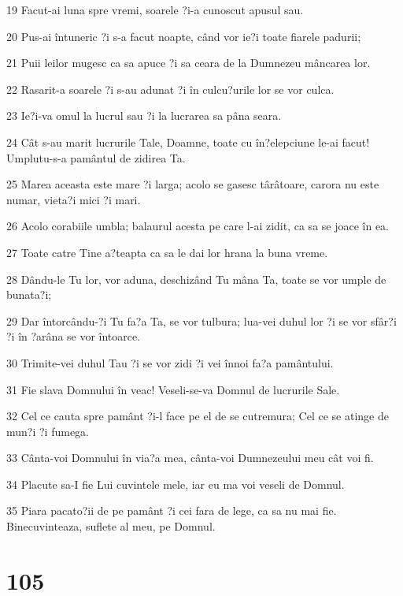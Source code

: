 \par 19 Facut-ai luna spre vremi, soarele ?i-a cunoscut apusul sau.
\par 20 Pus-ai întuneric ?i s-a facut noapte, când vor ie?i toate fiarele padurii;
\par 21 Puii leilor mugesc ca sa apuce ?i sa ceara de la Dumnezeu mâncarea lor.
\par 22 Rasarit-a soarele ?i s-au adunat ?i în culcu?urile lor se vor culca.
\par 23 Ie?i-va omul la lucrul sau ?i la lucrarea sa pâna seara.
\par 24 Cât s-au marit lucrurile Tale, Doamne, toate cu în?elepciune le-ai facut! Umplutu-s-a pamântul de zidirea Ta.
\par 25 Marea aceasta este mare ?i larga; acolo se gasesc târâtoare, carora nu este numar, vieta?i mici ?i mari.
\par 26 Acolo corabiile umbla; balaurul acesta pe care l-ai zidit, ca sa se joace în ea.
\par 27 Toate catre Tine a?teapta ca sa le dai lor hrana la buna vreme.
\par 28 Dându-le Tu lor, vor aduna, deschizând Tu mâna Ta, toate se vor umple de bunata?i;
\par 29 Dar întorcându-?i Tu fa?a Ta, se vor tulbura; lua-vei duhul lor ?i se vor sfâr?i ?i în ?arâna se vor întoarce.
\par 30 Trimite-vei duhul Tau ?i se vor zidi ?i vei înnoi fa?a pamântului.
\par 31 Fie slava Domnului în veac! Veseli-se-va Domnul de lucrurile Sale.
\par 32 Cel ce cauta spre pamânt ?i-l face pe el de se cutremura; Cel ce se atinge de mun?i ?i fumega.
\par 33 Cânta-voi Domnului în via?a mea, cânta-voi Dumnezeului meu cât voi fi.
\par 34 Placute sa-I fie Lui cuvintele mele, iar eu ma voi veseli de Domnul.
\par 35 Piara pacato?ii de pe pamânt ?i cei fara de lege, ca sa nu mai fie. Binecuvinteaza, suflete al meu, pe Domnul.

\chapter{105}

